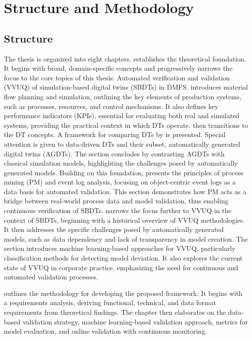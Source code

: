 \section{Structure and Methodology}

\subsection*{Structure}
The thesis is organized into eight chapters.
 establishes the theoretical foundation. It begins with broad, domain-specific concepts and progressively narrows the focus to the core topics of this thesis: Automated verification and validation (VVUQ) of simulation-based digital twins (SBDTs) in DMFS.
 introduces material flow planning and simulation, outlining the key elements of production systems, such as processes, resources, and control mechanisms. It also defines key performance indicators (KPIs), essential for evaluating both real and simulated systems, providing the practical context in which DTs operate.
 then transitions to the DT concepts. A framework for comparing DTs by \textcite{schwede2024learning} is presented. Special attention is given to data-driven DTs and their subset, automatically generated digital twins (AGDTs). The section concludes by contrasting AGDTs with classical simulation models, highlighting the challenges posed by automatically generated models.
Building on this foundation,  presents the principles of process mining (PM) and event log analysis, focusing on object-centric event logs as a data basis for automated validation. This section demonstrates how PM acts as a bridge between real-world process data and model validation, thus enabling continuous verification of SBDTs.
 narrows the focus further to VVUQ in the context of SBDTs, beginning with a historical overview of VVUQ methodologies. It then addresses the specific challenges posed by automatically generated models, such as data dependency and lack of transparency in model creation. The section introduces machine learning-based approaches for VVUQ, particularly classification methods for detecting model deviation. It also explores the current state of VVUQ in corporate practice, emphasizing the need for continuous and automated validation processes.

 outlines the methodology for developing the proposed framework. It begins with a requirements analysis, deriving functional, technical, and data format requirements from theoretical findings. The chapter then elaborates on the data-based validation strategy, machine learning-based validation approach, metrics for model evaluation, and online validation with continuous monitoring.

